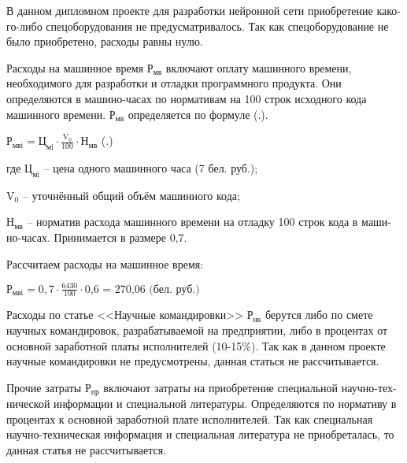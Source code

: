 {	\par \redline В данном дипломном проекте для разработки нейронной сети приобретение како- го-либо спецоборудования не предусматривалось. Так как спецоборудование не было приобретено, расходы равны нулю.

	\par \redline Расходы на машинное время $\textrm{Р}_{\textrm{мв}}$ включают оплату машинного времени, необходимого для разработки и отладки программного продукта. Они определяются в машино-часах по нормативам на 100 строк исходного кода машинного времени. $\textrm{Р}_{\textrm{мв}}$ определяется по формуле (\thechaptercntr .\theformulacntr).

	\formulaspace \par \redline 
		$\textrm{Р}_{\textrm{мвi}} = \textrm{Ц}_{\textrm{мi}} \cdot \frac{\textrm{V}_{\textrm{0}}}{\textrm{100}} \cdot \textrm{Н}_{\textrm{мв}}$
	\hfill (\thechaptercntr .\theformulacntr) \redline
	\formulaspace \addtocounter{formulacntr}{1}
 
	\par \redline где $\textrm{Ц}_{\textrm{мi}}$ {--} цена одного машинного часа (7 бел. руб.);
	\par \redline \wherespace $\textrm{V}_{\textrm{0}}$ {--} уточнённый общий объём машинного кода;
	\par \redline \wherespace $\textrm{Н}_{\textrm{мв}}$ {--} норматив расхода машинного времени на отладку 100 строк кода в маши- но-часах. Принимается в размере 0,7.

	\par \redline Рассчитаем расходы на машинное время:

	\formulaspace \par \redline 
		$\textrm{Р}_{\textrm{мвi}} = 0,7 \cdot \frac{6430}{100} \cdot \textrm{0,6 = 270,06 (бел. руб.)}$
	\formulaspace

	\par \redline Расходы по статье <<Научные командировки>> $\textrm{Р}_{\textrm{нк}}$ берутся либо по смете научных командировок, разрабатываемой на предприятии, либо в процентах от основной заработной платы исполнителей (10-15\%). Так как в данном проекте научные командировки не предусмотрены, данная статься не рассчитывается. 

	\par \redline Прочие затраты $\textrm{Р}_{\textrm{пр}}$ включают затраты на приобретение специальной научно-тех- нической информации и специальной литературы. Определяются по нормативу в процентах к основной заработной плате исполнителей. Так как специальная научно-техническая информация и специальная литература не приобреталась, то данная статья не рассчитывается. 

}
